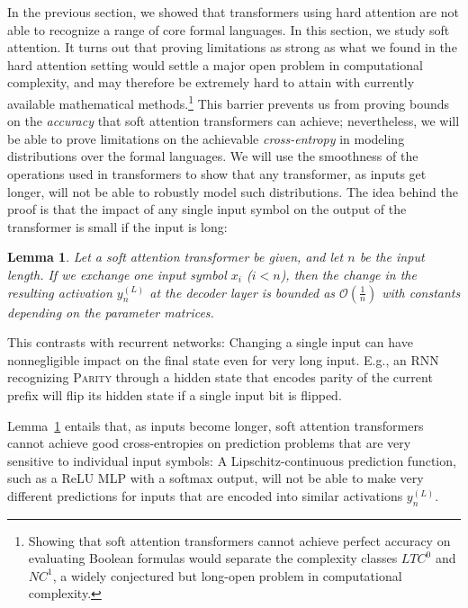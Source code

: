 \documentclass[11pt,a4paper]{article}
\newcounter{theorem}
\newtheorem{lemma}[theorem]{Lemma}
\begin{document}
In the previous section, we showed that transformers using hard attention are not able to recognize a range of core formal languages.
In this section, we study soft attention.
It turns out that proving limitations as strong as what we found in the hard attention setting would settle a major open problem in computational complexity, and  may therefore be extremely hard to attain with currently available mathematical methods.\footnote{Showing that soft attention transformers cannot achieve perfect accuracy on evaluating Boolean formulas would separate the complexity classes $LTC^0$ and $NC^1$, a widely conjectured but long-open problem in computational complexity.}
This barrier prevents us from proving bounds on the \emph{accuracy} that soft attention transformers can achieve; nevertheless, we will be able to prove limitations on the achievable \emph{cross-entropy} in modeling distributions over the formal languages.
We will use the smoothness of the operations used in transformers to show that any transformer, as inputs get longer, will not be able to robustly model such distributions.
The idea behind the proof is that the impact of any single input symbol on the output of the transformer is small if the input is long:
\begin{lemma}\label{lem:soft-tech}
Let a soft attention transformer be given, and let $n$ be the input length.
If we exchange one input symbol $x_i$ ($i < n$), %
then the change in the resulting activation $y_n^{(L)}$ at the decoder layer is bounded as $\mathcal{O}(\frac{1}{n})$ with constants depending on the parameter matrices.
\end{lemma}
This contrasts with recurrent networks:
Changing a single input can have nonnegligible impact on the final state even for very long input.
E.g., an RNN recognizing \textsc{Parity} through a hidden state that encodes parity of the current prefix will flip its hidden state if a single input bit is flipped.


Lemma~\ref{lem:soft-tech} entails that, as inputs become longer, soft attention transformers cannot achieve good cross-entropies on prediction problems that are very sensitive to individual input symbols:
A Lipschitz-continuous prediction function, such as a ReLU MLP with a softmax output, will not be able to make very different predictions for inputs that are encoded into similar activations $y_n^{(L)}$.

\end{document}
